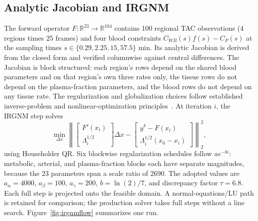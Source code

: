 \documentclass[sigconf,nonacm]{acmart}
\begin{document}
\subsection{Analytic Jacobian and IRGNM}

The forward operator $F:\mathbb{R}^{23}\rightarrow\mathbb{R}^{104}$ contains 100 regional TAC observations (4 regions times 25 frames) and four blood constraints $C_{WB}(s)f(s)-C_P(s)$ at the sampling times $s\in\{0.29,2.25,15,57.5\}$ min. Its analytic Jacobian is derived from the closed form and verified columnwise against central differences. The Jacobian is block structured: each region's rows depend on the shared blood parameters and on that region's own three rates only, the tissue rows do not depend on the plasma-fraction parameters, and the blood rows do not depend on any tissue rate. The regularization and globalization choices follow established inverse-problem and nonlinear-optimization principles~\cite{hansen2010,nocedal2006}. At iteration $i$, the IRGNM step solves
\begin{equation}
\min_{\Delta x}\left\|
\begin{bmatrix}F'(x_i)\\ \Lambda_i^{1/2}\end{bmatrix}\Delta x-
\begin{bmatrix}y^\delta-F(x_i)\\ \Lambda_i^{1/2}(x_0-x_i)\end{bmatrix}
\right\|_2^2,
\label{eq:irgnm}
\end{equation}
using Householder QR. Six blockwise regularization schedules follow $a e^{-bi}$: metabolic, arterial, and plasma-fraction blocks each have separate magnitudes, because the 23 parameters span a scale ratio of 2690. The adopted values are $a_\alpha=4000$, $a_\beta=100$, $a_\gamma=200$, $b=\ln(2)/7$, and discrepancy factor $\tau=6.8$. Each full step is projected onto the feasible domain. A normal-equations/LU path is retained for comparison; the production solver takes full steps without a line search. Figure~\ref{fig:irgnmflow} summarizes one run.
\end{document}
